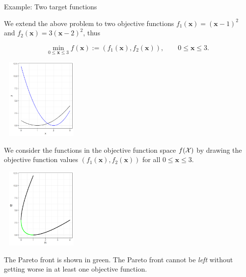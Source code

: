 \documentclass[11pt,compress,t,notes=noshow, xcolor=table]{beamer}
\begin{document}
\begin{vbframe}{Example: Two target functions}

We extend the above problem to two objective functions $f_1(\bm{x}) = (\bm{x} - 1)^2$ and $f_2(\bm{x}) = 3(\bm{x} - 2)^2$, thus

$$
\min_{0 \le \bm{x} \le 3} f(\bm{x}) := \left(f_1(\bm{x}), f_2(\bm{x})\right), \qquad 0 \le \bm{x} \le 3.
$$

\vspace*{0.1cm}

\begin{center}
\includegraphics[width = 4cm, height = 4cm ]{figure_man/two-target-func.png}
\end{center}


\framebreak

We consider the functions in the objective function space $f(\mathcal{X})$ by drawing the objective function values $\left(f_1(\bm{x}), f_2(\bm{x})\right)$ for all $0 \le \bm{x} \le 3$.

\vspace*{0.1cm}

\begin{center}
\includegraphics[width = 4cm, height = 4cm ]{figure_man/pareto-front.png}
\end{center}

\vspace*{-0.3cm}

The Pareto front is shown in green.
The Pareto front cannot be \emph{left} without getting worse in at least one objective function.

\end{vbframe}
\end{document}
